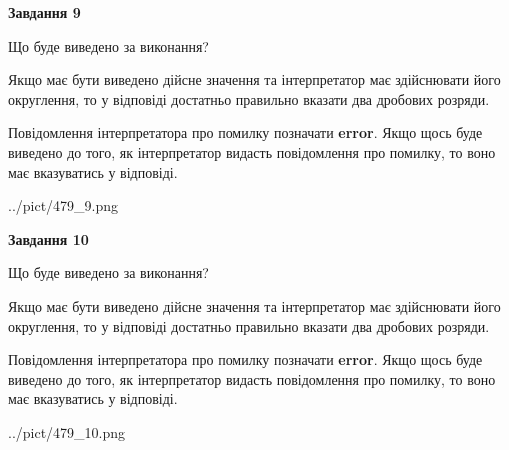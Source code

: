 \documentclass[12pt, ukrainian]{article}
\begin{document}
{\begin {Large}
{\begin {center}\textbf{Завдання 9}\end {center}}\par
Що буде виведено за виконання? \par

Якщо має бути виведено дійсне значення та інтерпретатор має здійснювати його округлення, 
то у відповіді достатньо правильно вказати два дробових розряди.

Повідомлення інтерпретатора про помилку позначати \textbf{error}.
Якщо щось буде виведено до того, як інтерпретатор видасть повідомлення про помилку, 
то воно має вказуватись у відповіді. \par

\begin{center}
	{../pict/479_9.png}
\end{center}
\newpage

{\begin {center}\textbf{Завдання 10}\end {center}}\par
Що буде виведено за виконання? \par

Якщо має бути виведено дійсне значення та інтерпретатор має здійснювати його округлення, 
то у відповіді достатньо правильно вказати два дробових розряди.

Повідомлення інтерпретатора про помилку позначати \textbf{error}.
Якщо щось буде виведено до того, як інтерпретатор видасть повідомлення про помилку, 
то воно має вказуватись у відповіді. \par

\begin{center}
	{../pict/479_10.png}
\end{center}
\newpage

\end {Large}}
\end{document}
